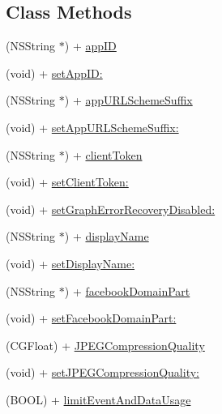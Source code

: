 \subsection*{Class Methods}
\begin{DoxyCompactItemize}
\item 
(N\+S\+String $\ast$) + \hyperlink{interface_f_b_s_d_k_settings_a0041724aca5e4f0e13f52aaa11beb2af}{app\+I\+D}
\item 
(void) + \hyperlink{interface_f_b_s_d_k_settings_a0a61ae6f92ae198ddaa113307566fd90}{set\+App\+I\+D\+:}
\item 
(N\+S\+String $\ast$) + \hyperlink{interface_f_b_s_d_k_settings_a0fcd8a2d4454a4a6cedc0dd488e06b94}{app\+U\+R\+L\+Scheme\+Suffix}
\item 
(void) + \hyperlink{interface_f_b_s_d_k_settings_ad82e92557a24e7de2275aec2db8432e5}{set\+App\+U\+R\+L\+Scheme\+Suffix\+:}
\item 
(N\+S\+String $\ast$) + \hyperlink{interface_f_b_s_d_k_settings_a281a16a620cbadd20dda5e4855640d47}{client\+Token}
\item 
(void) + \hyperlink{interface_f_b_s_d_k_settings_a70315485940c82fb7c98fb819f8df21e}{set\+Client\+Token\+:}
\item 
(void) + \hyperlink{interface_f_b_s_d_k_settings_a5bf7b01d1cdc577b603f2fd12e61c5a8}{set\+Graph\+Error\+Recovery\+Disabled\+:}
\item 
(N\+S\+String $\ast$) + \hyperlink{interface_f_b_s_d_k_settings_a6d772f95f3d504de70d1066be50c3991}{display\+Name}
\item 
(void) + \hyperlink{interface_f_b_s_d_k_settings_adb14b3ed74f013f0b3689f301cbe0405}{set\+Display\+Name\+:}
\item 
(N\+S\+String $\ast$) + \hyperlink{interface_f_b_s_d_k_settings_afe195ff5d7e03b3c2a50a260f28ab69b}{facebook\+Domain\+Part}
\item 
(void) + \hyperlink{interface_f_b_s_d_k_settings_a861fe9b96ab5fa88dc13be3f40193e19}{set\+Facebook\+Domain\+Part\+:}
\item 
(C\+G\+Float) + \hyperlink{interface_f_b_s_d_k_settings_a8bf3cebcfa7cc64d563efad000682800}{J\+P\+E\+G\+Compression\+Quality}
\item 
(void) + \hyperlink{interface_f_b_s_d_k_settings_a9ec12991ab33980d618a4470de56e15e}{set\+J\+P\+E\+G\+Compression\+Quality\+:}
\item 
(B\+O\+O\+L) + \hyperlink{interface_f_b_s_d_k_settings_a6e112856c4a8e12f9a7b1aa38550bb97}{limit\+Event\+And\+Data\+Usage}
\item 

\end{DoxyCompactItemize}
